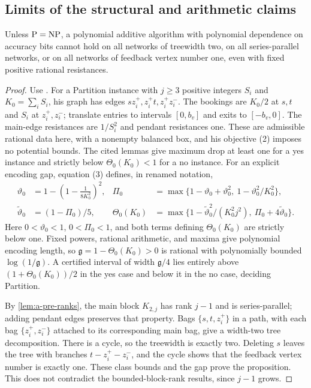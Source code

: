 \subsection{Limits of the structural and arithmetic claims}
\begin{proposition}
\label{prop:a-blk-limits}
Unless $\mathrm P=\mathrm{NP}$, a polynomial additive algorithm with polynomial
dependence on accuracy bits cannot hold on all networks of treewidth
two, on all series-parallel networks, or on all networks of feedback
vertex number one, even with fixed positive rational resistances.
\end{proposition}
\begin{proof}
Use \citet[Section 4, Figure 2, equation (3), and Lemmas 4.3 and 4.17
(numbering of the April 6, 2022 manuscript)]{thurauf2022-deciding-the-feasibility-of-a}.
For a Partition instance with $j\ge3$ positive integers $S_i$ and
$K_0=\sum_iS_i$, his graph has edges
$sz_i^+,z_i^+t,z_i^+z_i^-$.
The bookings are $K_0/2$ at $s,t$ and $S_i$ at $z_i^+,z_i^-$;
translate entries to intervals $[0,b_v]$ and exits to $[-b_v,0]$.
The main-edge resistances are $1/S_i^2$ and pendant resistances one.
These are admissible rational data here, with a nonempty balanced box,
and his objective (2) imposes no potential bounds. The cited lemmas
give maximum drop at least one for a yes instance and strictly below
$\Theta_0(K_0)<1$ for a no instance. For an explicit encoding gap,
equation (3) defines, in renamed notation,
\begin{align*}
 \vartheta_0&=1-\left(1-\frac{1}{8K_0^2}\right)^2,&
 \Pi_0&=\max\{1-\vartheta_0+\vartheta_0^2,\ 1-\vartheta_0^2/K_0^2\},\\
 \widetilde\vartheta_0&=(1-\Pi_0)/5,&
 \Theta_0(K_0)&=\max\{1-\widetilde\vartheta_0^2/(K_0^2j^2),\ \Pi_0+4\widetilde\vartheta_0\}.
\end{align*}
Here $0<\vartheta_0<1$, $0<\Pi_0<1$, and both terms defining $\Theta_0(K_0)$ are
strictly below one. Fixed powers, rational arithmetic, and maxima give
polynomial encoding length, so $\mathfrak g=1-\Theta_0(K_0)>0$ is rational with
polynomially bounded $\log(1/\mathfrak g)$. A certified interval of width $\mathfrak g/4$
lies entirely above $(1+\Theta_0(K_0))/2$ in the yes case and below it in the
no case, deciding Partition.

By \cref{lem:a-pre-ranks}, the main block $K_{2,j}$ has rank $j-1$
and is series-parallel; adding pendant edges preserves that property. Bags
$\{s,t,z_i^+\}$ in a path, with each bag $\{z_i^+,z_i^-\}$ attached
to its corresponding main bag, give a width-two tree decomposition.
There is a cycle, so the treewidth is exactly two. Deleting $s$ leaves
the tree with branches $t-z_i^+-z_i^-$, and the cycle shows that the
feedback vertex number is exactly one. These class bounds and the gap
prove the proposition. This does not contradict the bounded-block-rank
results, since $j-1$ grows.
\end{proof}

